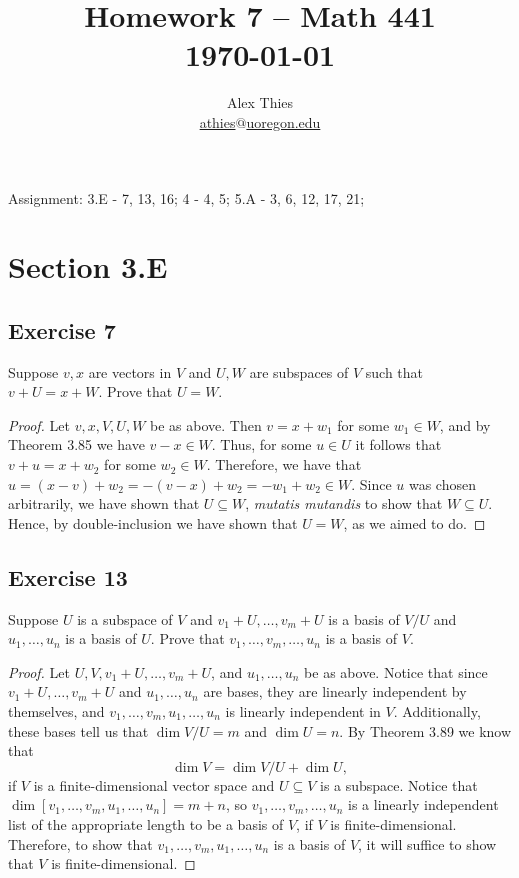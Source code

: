 \documentclass[letterpaper, 12pt]{amsart}
\theoremstyle{definition}  							%
\begin{document}
	\title{Homework 7  -- Math 441 \\ \today}
	\author{Alex Thies \\ \href{mailto:athies@uoregon.edu}{\lowercase{athies$@$uoregon.edu}}}

	\maketitle

	Assignment: 3.E - 7, 13, 16; 4 - 4, 5; 5.A - 3, 6, 12, 17, 21;

	\section*{Section 3.E}
		\subsection*{Exercise 7}
		Suppose $v, x$ are vectors in $V$ and $U, W$ are subspaces of $V$ such that $v + U = x + W$. 
		Prove that $U = W$.

		\begin{proof}
		Let $v, x, V, U, W$ be as above.
		Then $v = x + w_{1}$ for some $w_{1} \in W$, and by Theorem 3.85 we have $v - x \in W$.
		Thus, for some $u \in U$ it follows that $v + u = x + w_{2}$ for some $w_{2} \in W$.
		Therefore, we have that $u = (x-v) + w_{2} = -(v-x) + w_{2} = -w_{1}+w_{2} \in W$.
		Since $u$ was chosen arbitrarily, we have shown that $U \subseteq W$, \textit{mutatis mutandis} to show that $W \subseteq U$.
		Hence, by double-inclusion we have shown that $U = W$, as we aimed to do.
		\end{proof}

		\subsection*{Exercise 13}
		Suppose $U$ is a subspace of $V$ and $v_{1} + U, \dots, v_{m} + U$ is a basis of $V/U$ and $u_{1}, \dots, u_{n}$ is a basis of $U$. 
		Prove that $v_{1}, \dots, v_{m}, \dots, u_{n}$ is a basis of $V$.

		\begin{proof}
		Let $U, V, v_{1} + U, \dots, v_{m} + U$, and $u_{1}, \dots, u_{n}$ be as above.
		Notice that since $v_{1} + U, \dots, v_{m} + U$ and $u_{1}, \dots, u_{n}$ are bases, they are linearly independent by themselves, and $v_{1}, \dots, v_{m}, u_{1}, \dots, u_{n}$ is linearly independent in $V$.
		Additionally, these bases tell us that $\dim V/U = m$ and $\dim U = n$.
		By Theorem 3.89 we know that $$\dim V = \dim V/U + \dim U,$$ if $V$ is a finite-dimensional vector space and $U \subseteq V$ is a subspace.
		Notice that $\dim[v_{1}, \dots, v_{m}, u_{1}, \dots, u_{n}] = m+n$, so $v_{1}, \dots, v_{m}, \dots, u_{n}$ is a linearly independent list of the appropriate length to be a basis of $V$, if $V$ is finite-dimensional.
		Therefore, to show that $v_{1}, \dots, v_{m}, u_{1}, \dots, u_{n}$ is a basis of $V$, it will suffice to show that $V$ is finite-dimensional.
		\end{proof}
\end{document}
